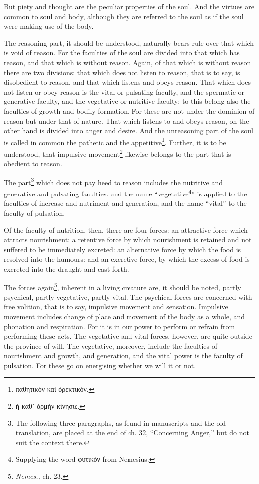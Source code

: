 But piety and thought are the peculiar properties of the soul. And the virtues are common to soul and body, although they are referred to the soul as if the soul were making use of the body.

The reasoning part, it should be understood, naturally bears rule over that which is void of reason. For the faculties of the soul are divided into that which has reason, and that which is without reason. Again, of that which is without reason there are two divisions: that which does not listen to reason, that is to say, is disobedient to reason, and that which listens and obeys reason. That which does not listen or obey reason is the vital or pulsating faculty, and the spermatic or generative faculty, and the vegetative or nutritive faculty: to this belong also the faculties of growth and bodily formation. For these are not under the dominion of reason but under that of nature. That which listens to and obeys reason, on the other hand is divided into anger and desire. And the unreasoning part of the soul is called in common the pathetic and the appetitive\footnote{\textgreek{παθητικὸν καὶ ὀρεκτικόν}.}. Further, it is to be understood, that impulsive movement\footnote{\textgreek{ἡ καθ᾽ ὁρμὴν κίνησις}.} likewise belongs to the part that is obedient to reason.

The part\footnote{The following three paragraphs, as found in manuscripts and the old translation, are placed at the end of ch. 32, “Concerning Anger,” but do not suit the context there.} which does not pay heed to reason includes the nutritive and generative and pulsating faculties: and the name “vegetative\footnote{Supplying the word \textgreek{φυτικόν} from Nemesius.}” is applied to the faculties of increase and nutriment and generation, and the name “vital” to the faculty of pulsation.

Of the faculty of nutrition, then, there are four forces: an attractive force which attracts nourishment: a retentive force by which nourishment is retained and not suffered to be immediately excreted: an alternative force by which the food is resolved into the humours: and an excretive force, by which the excess of food is excreted into the draught and cast forth.

The forces again\footnote{\emph{Nemes.,} ch. 23.}, inherent in a living creature are, it should be noted, partly psychical, partly vegetative, partly vital. The psychical forces are concerned with free volition, that is to say, impulsive movement and sensation. Impulsive movement includes change of place and movement of the body as a whole, and phonation and respiration. For it is in our power to perform or refrain from performing these acts. The vegetative and vital forces, however, are quite outside the province of will. The vegetative, moreover, include the faculties of nourishment and growth, and generation, and the vital power is the faculty of pulsation. For these go on energising whether we will it or not.

